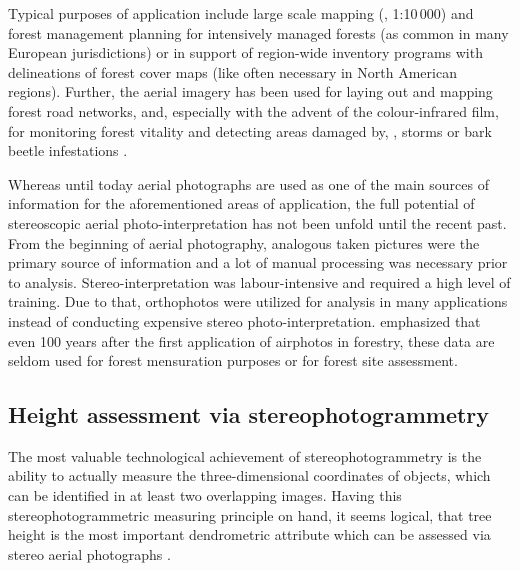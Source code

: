 Typical purposes of application  
include large scale mapping (\eg, 1:10\,000) and forest management planning for intensively managed forests 
(as common in many European jurisdictions) or in support of region-wide inventory programs with delineations 
of forest cover maps (like often necessary in North American regions). 
Further, the aerial imagery has been used for laying out and mapping forest road networks, 
and, especially with the advent of the colour-infrared film, for monitoring forest vitality and detecting areas damaged by,
\eg, storms or bark beetle infestations \parencite{Hildebrandt.1996}.

Whereas until today aerial photographs are used as one of the main sources of information for the aforementioned areas of application, 
the full potential of stereoscopic aerial photo-interpretation has not been unfold until the recent past. 
From the beginning of aerial photography, analogous taken pictures were the primary source of information
and a lot of manual processing was necessary prior to analysis. Stereo-interpretation was labour-intensive and required a high level of training.
Due to that, orthophotos were utilized for analysis in many applications instead of conducting expensive stereo photo-interpretation.
\textcite{Hildebrandt.1996} emphasized that even 100 years after the first application of airphotos in forestry, 
these data are seldom used for forest mensuration purposes or for forest site assessment. 

\subsection{Height assessment via stereophotogrammetry}\label{subsec:HeighAssessStereo}

The  most valuable technological achievement of stereophotogrammetry 
is the ability to actually measure the three-dimensional coordinates of objects, 
which can be identified in at least two overlapping images. 
Having this stereophotogrammetric measuring principle on hand, it seems logical, that tree height is the most important dendrometric attribute 
which can be assessed via stereo aerial photographs \parencite{Paine.2012}.

